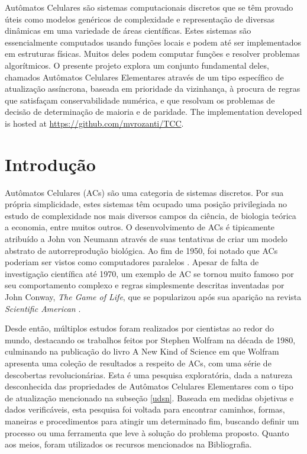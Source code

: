 \documentclass[a4paper,12pt]{ltxdoc}
\newcommand\tab[1][1cm]{\hspace*{#1}}
\begin{document}
\begin{resumo}
  Autômatos Celulares são sistemas computacionais discretos que se têm provado úteis como modelos genéricos de complexidade e representação de diversas dinâmicas em uma variedade de áreas científicas. Estes sistemas são essencialmente computados usando funções locais e podem até ser implementados em estruturas físicas. Muitos deles podem computar funções e resolver problemas algorítmicos. O presente projeto explora um conjunto fundamental deles, chamados Autômatos Celulares Elementares através de um tipo específico de atualização assíncrona, baseada em prioridade da vizinhança, à procura de regras que satisfaçam conservabilidade numérica, e que resolvam os problemas de decisão de determinação de maioria e de paridade.
  The implementation developed is hosted at \url{https://github.com/mvrozanti/TCC}.
\end{resumo}

\renewcommand{\contentsname}{\centerline{\Large Sumário}}

\section{Introdução}

Autômatos Celulares (ACs) são uma categoria de sistemas discretos. Por sua própria simplicidade, estes sistemas têm ocupado uma posição privilegiada no estudo de complexidade nos mais diversos campos da ciência, de biologia teórica a economia, entre muitos outros. O desenvolvimento de ACs é tipicamente atribuído a John von Neumann através de suas tentativas de criar um modelo abstrato de autorreprodução biológica. Ao fim de 1950, foi notado que ACs poderiam ser vistos como computadores paralelos \cite[p. 876]{wolfram2002new}. Apesar de falta de investigação científica até 1970, um exemplo de AC se tornou muito famoso por seu comportamento complexo e regras simplesmente descritas inventadas por John Conway, \textit{The Game of Life}, que se popularizou após sua aparição na revista \textit{Scientific American} \cite{gardner1970mathematical}. 

\tab Desde então, múltiplos estudos foram realizados por cientistas ao redor do mundo, destacando os trabalhos feitos por Stephen Wolfram na década de 1980, culminando na publicação do livro A New Kind of Science em que Wolfram apresenta uma coleção de resultados a respeito de ACs, com uma série de descobertas revolucionárias.  
Esta é uma pesquisa exploratória, dada a natureza desconhecida das propriedades de Autômatos Celulares Elementares com o tipo de atualização mencionado na subseção \ref{udsn}. Baseada em medidas objetivas e dados verificáveis, esta pesquisa foi voltada para encontrar caminhos, formas, maneiras e procedimentos para atingir um determinado fim, buscando definir um processo ou uma ferramenta que leve à solução do problema proposto. Quanto aos meios, foram utilizados os recursos mencionados na Bibliografia.
\end{document}
